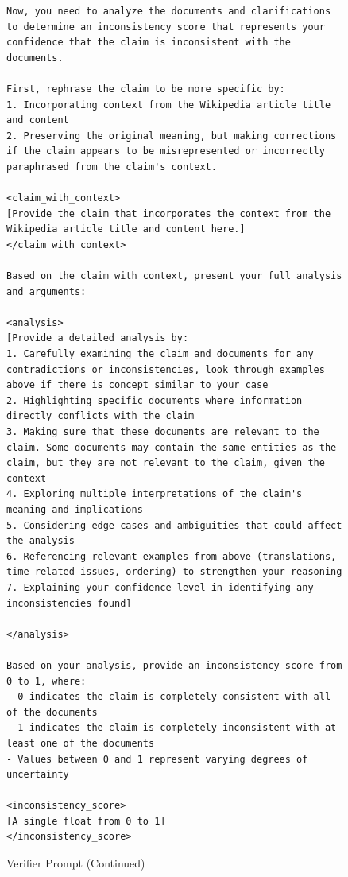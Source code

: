 \begin{figure}[htb]
\begin{lstlisting}
Now, you need to analyze the documents and clarifications to determine an inconsistency score that represents your confidence that the claim is inconsistent with the documents.

First, rephrase the claim to be more specific by:
1. Incorporating context from the Wikipedia article title and content
2. Preserving the original meaning, but making corrections if the claim appears to be misrepresented or incorrectly paraphrased from the claim's context.

<claim_with_context>
[Provide the claim that incorporates the context from the Wikipedia article title and content here.]
</claim_with_context>

Based on the claim with context, present your full analysis and arguments:

<analysis>
[Provide a detailed analysis by:
1. Carefully examining the claim and documents for any contradictions or inconsistencies, look through examples above if there is concept similar to your case
2. Highlighting specific documents where information directly conflicts with the claim
3. Making sure that these documents are relevant to the claim. Some documents may contain the same entities as the claim, but they are not relevant to the claim, given the context
4. Exploring multiple interpretations of the claim's meaning and implications
5. Considering edge cases and ambiguities that could affect the analysis
6. Referencing relevant examples from above (translations, time-related issues, ordering) to strengthen your reasoning
7. Explaining your confidence level in identifying any inconsistencies found]

</analysis>

Based on your analysis, provide an inconsistency score from 0 to 1, where:
- 0 indicates the claim is completely consistent with all of the documents
- 1 indicates the claim is completely inconsistent with at least one of the documents
- Values between 0 and 1 represent varying degrees of uncertainty

<inconsistency_score>
[A single float from 0 to 1]
</inconsistency_score>
\end{lstlisting}

\caption{Verifier Prompt (Continued)} \label{lst:verifier_3}
\end{figure}


